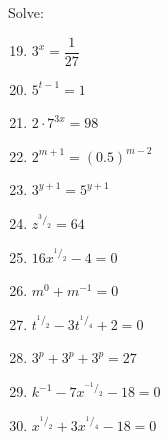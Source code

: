 \begin{eocexercises}{}
Solve:
\begin{multicols}{2}
\begin{enumerate}[noitemsep, label=\textbf{\arabic*}., itemsep=5pt]
\setcounter{enumi}{18}
\item $ 3^x = \dfrac{1}{27} $
\item $ 5^{t-1} = 1 $
\item $ 2 \cdot 7^{3x} = 98 $
\item $ 2^{m+1} = (0.5)^{m-2}$
\item $ 3^{y+1} = 5^{y+1} $
\item $ z^{^3/_2} = 64 $
\item $ 16x^{^1/_2} - 4 = 0 $
\item $ m^0 + m^{-1} = 0 $
\item $ t^{^1/_2} - 3t^{^1/_4} + 2 = 0 $
\item $ 3^p + 3^p + 3^p = 27 $
\item $ k^{-1} - 7x^{^{-1}/_2} -18 = 0 $
\item $ x^{^1/_2}+3x^{^1/_4}-18 = 0 $
\end{enumerate}
\end{multicols}


\end{eocexercises}

